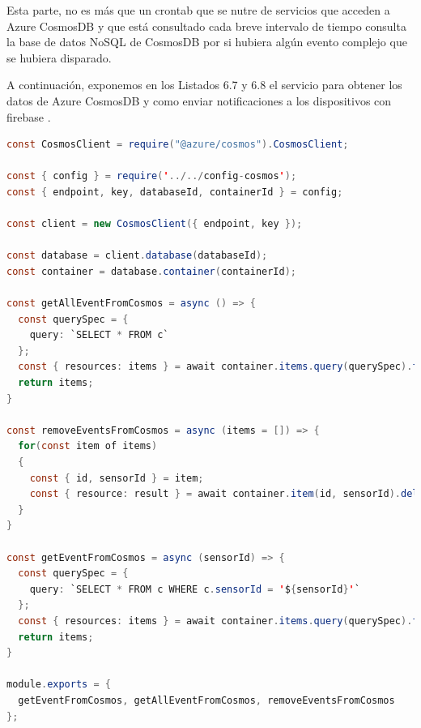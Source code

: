 Esta parte, no es más que un crontab \cite{crontab} que se nutre de servicios que acceden a Azure CosmosDB \cite{cosmosdb} y que está consultado cada breve intervalo de tiempo consulta la base de datos NoSQL de CosmosDB por si hubiera algún evento complejo que se hubiera disparado.

A continuación, exponemos en los Listados 6.7 y 6.8 el servicio para obtener los datos de Azure CosmosDB \cite{cosmosdb} y como enviar notificaciones a los dispositivos con firebase \cite{firebase}.

\begin{lstlisting}[language=Java,caption={Listado de Eventos de Azure CosmosDB},captionpos=b]
const CosmosClient = require("@azure/cosmos").CosmosClient;

const { config } = require('../../config-cosmos');
const { endpoint, key, databaseId, containerId } = config;

const client = new CosmosClient({ endpoint, key });

const database = client.database(databaseId);
const container = database.container(containerId);

const getAllEventFromCosmos = async () => {
  const querySpec = {
    query: `SELECT * FROM c`
  };
  const { resources: items } = await container.items.query(querySpec).fetchAll();
  return items;
}

const removeEventsFromCosmos = async (items = []) => {
  for(const item of items)
  {
    const { id, sensorId } = item;
    const { resource: result } = await container.item(id, sensorId).delete();
  }
}

const getEventFromCosmos = async (sensorId) => {
  const querySpec = {
    query: `SELECT * FROM c WHERE c.sensorId = '${sensorId}'`
  };
  const { resources: items } = await container.items.query(querySpec).fetchAll();
  return items;
}

module.exports = {
  getEventFromCosmos, getAllEventFromCosmos, removeEventsFromCosmos
};
\end{lstlisting}

